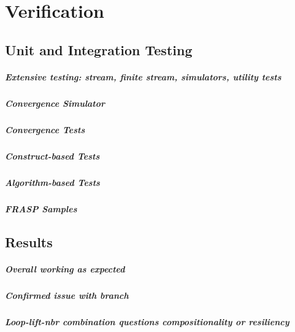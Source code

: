 
\chapter{Verification}
\label{chapter:verification}

\section{Unit and Integration Testing}
\paragraph{Extensive testing: stream, finite stream, simulators, utility tests}
\paragraph{Convergence Simulator}
\paragraph{Convergence Tests}
\paragraph{Construct-based Tests}
\paragraph{Algorithm-based Tests}
\paragraph{FRASP Samples}

\section{Results}
\paragraph{Overall working as expected}
\paragraph{Confirmed issue with branch}
\paragraph{Loop-lift-nbr combination questions compositionality or resiliency}